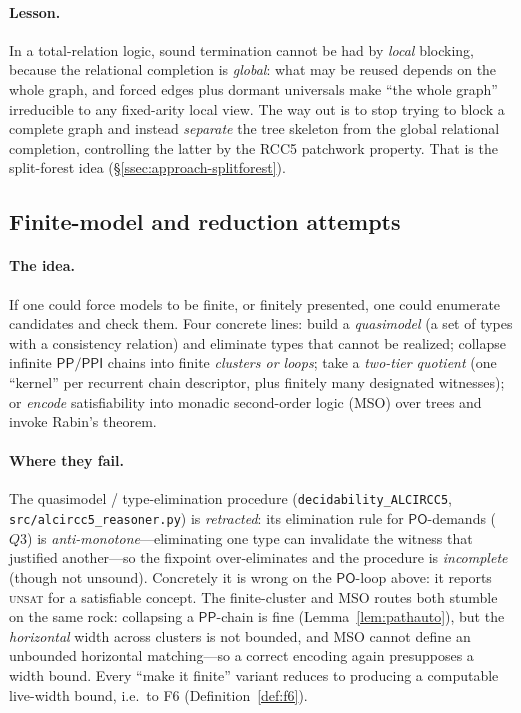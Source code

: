 \documentclass[11pt]{article}
\newcommand{\PO}{\mathsf{PO}}
\newcommand{\PP}{\mathsf{PP}}
\newcommand{\PPI}{\mathsf{PPI}}
\theoremstyle{plain}
\theoremstyle{definition}
\begin{document}
\paragraph{Lesson.} In a total-relation logic, sound termination cannot be
had by \emph{local} blocking, because the relational completion is
\emph{global}: what may be reused depends on the whole graph, and forced
edges plus dormant universals make ``the whole graph'' irreducible to any
fixed-arity local view. The way out is to stop trying to block a complete
graph and instead \emph{separate} the tree skeleton from the global
relational completion, controlling the latter by the RCC5 patchwork
property. That is the split-forest idea (\S\ref{ssec:approach-splitforest}).

\subsection{Finite-model and reduction attempts}
\label{ssec:approach-finite}

\paragraph{The idea.} If one could force models to be finite, or finitely
presented, one could enumerate candidates and check them. Four concrete
lines: build a \emph{quasimodel} (a set of types with a consistency
relation) and eliminate types that cannot be realized; collapse infinite
$\PP/\PPI$ chains into finite \emph{clusters or loops}; take a
\emph{two-tier quotient} (one ``kernel'' per recurrent chain descriptor,
plus finitely many designated witnesses); or \emph{encode} satisfiability
into monadic second-order logic (MSO) over trees and invoke Rabin's
theorem.

\paragraph{Where they fail.} The quasimodel / type-elimination procedure
(\texttt{decidability\_ALCIRCC5}, \texttt{src/alcircc5\_reasoner.py}) is
\emph{retracted}: its elimination rule for $\PO$-demands ($Q3$) is
\emph{anti-monotone}---eliminating one type can invalidate the witness
that justified another---so the fixpoint over-eliminates and the procedure
is \emph{incomplete} (though not unsound). Concretely it is wrong on the
$\PO$-loop above: it reports \textsc{unsat} for a satisfiable concept. The
finite-cluster and MSO routes both stumble on the same rock: collapsing a
$\PP$-chain is fine (Lemma~\ref{lem:pathauto}), but the \emph{horizontal}
width across clusters is not bounded, and MSO cannot define an unbounded
horizontal matching---so a correct encoding again presupposes a width
bound. Every ``make it finite'' variant reduces to producing a computable
live-width bound, i.e.\ to F6 (Definition~\ref{def:f6}).
\end{document}
